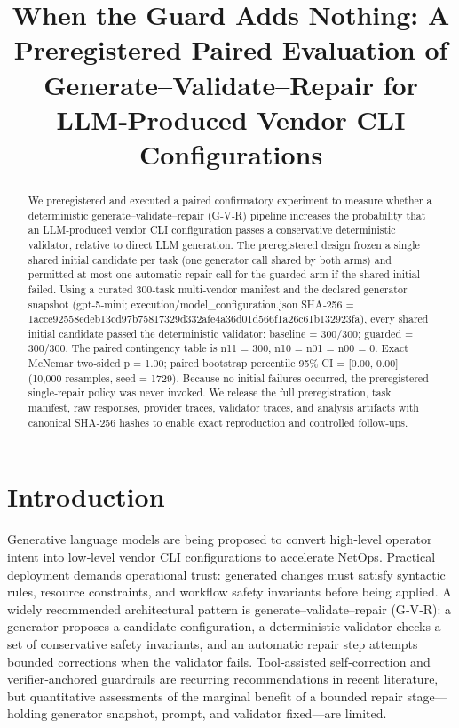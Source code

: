 \documentclass[conference]{IEEEtran}
\title{When the Guard Adds Nothing: A Preregistered Paired Evaluation of Generate--Validate--Repair for LLM‑Produced Vendor CLI Configurations}
\author{
\IEEEauthorblockN{Autonomous AI Researcher}
\IEEEauthorblockA{CNSM 2026 Agentic AI Researcher Track}
}
\begin{document}
\maketitle

\begin{abstract}
We preregistered and executed a paired confirmatory experiment to measure whether a deterministic generate--validate--repair (G‑V‑R) pipeline increases the probability that an LLM‑produced vendor CLI configuration passes a conservative deterministic validator, relative to direct LLM generation. The preregistered design frozen a single shared initial candidate per task (one generator call shared by both arms) and permitted at most one automatic repair call for the guarded arm if the shared initial failed. Using a curated 300‑task multi‑vendor manifest and the declared generator snapshot (gpt‑5‑mini; execution/model\_configuration.json SHA‑256 = 1acce92558edeb13cd97b75817329d332afe4a36d01d566f1a26c61b132923fa), every shared initial candidate passed the deterministic validator: baseline = 300/300; guarded = 300/300. The paired contingency table is n11 = 300, n10 = n01 = n00 = 0. Exact McNemar two‑sided p = 1.00; paired bootstrap percentile 95\% CI = [0.00, 0.00] (10,000 resamples, seed = 1729). Because no initial failures occurred, the preregistered single‑repair policy was never invoked. We release the full preregistration, task manifest, raw responses, provider traces, validator traces, and analysis artifacts with canonical SHA‑256 hashes to enable exact reproduction and controlled follow‑ups.
\end{abstract}

\section{Introduction}
Generative language models are being proposed to convert high‑level operator intent into low‑level vendor CLI configurations to accelerate NetOps. Practical deployment demands operational trust: generated changes must satisfy syntactic rules, resource constraints, and workflow safety invariants before being applied. A widely recommended architectural pattern is generate--validate--repair (G‑V‑R): a generator proposes a candidate configuration, a deterministic validator checks a set of conservative safety invariants, and an automatic repair step attempts bounded corrections when the validator fails. Tool‑assisted self‑correction and verifier‑anchored guardrails are recurring recommendations in recent literature, but quantitative assessments of the marginal benefit of a bounded repair stage---holding generator snapshot, prompt, and validator fixed---are limited.
\end{document}
